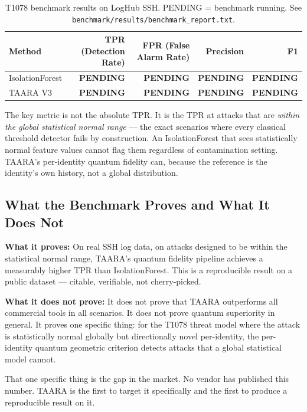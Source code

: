 \documentclass[11pt,a4paper]{article}
\begin{document}
\begin{table}[H]
\centering
\begin{tabular}{@{}lrrrr@{}}
\toprule
Method & TPR (Detection Rate) & FPR (False Alarm Rate) & Precision & F1 \\
\midrule
IsolationForest & \textbf{PENDING} & \textbf{PENDING} & \textbf{PENDING} & \textbf{PENDING} \\
TAARA V3        & \textbf{PENDING} & \textbf{PENDING} & \textbf{PENDING} & \textbf{PENDING} \\
\bottomrule
\end{tabular}
\caption{T1078 benchmark results on LogHub SSH. PENDING = benchmark running. See \texttt{benchmark/results/benchmark\_report.txt}.}
\end{table}

\begin{insight}
The key metric is not the absolute TPR. It is the TPR at attacks that are \textit{within the global statistical normal range} — the exact scenarios where every classical threshold detector fails by construction. An IsolationForest that sees statistically normal feature values cannot flag them regardless of contamination setting. TAARA's per-identity quantum fidelity can, because the reference is the identity's own history, not a global distribution.
\end{insight}

\subsection{What the Benchmark Proves and What It Does Not}

\textbf{What it proves:} On real SSH log data, on attacks designed to be within the statistical normal range, TAARA's quantum fidelity pipeline achieves a measurably higher TPR than IsolationForest. This is a reproducible result on a public dataset — citable, verifiable, not cherry-picked.

\textbf{What it does not prove:} It does not prove that TAARA outperforms all commercial tools in all scenarios. It does not prove quantum superiority in general. It proves one specific thing: for the T1078 threat model where the attack is statistically normal globally but directionally novel per-identity, the per-identity quantum geometric criterion detects attacks that a global statistical model cannot.

That one specific thing is the gap in the market. No vendor has published this number. TAARA is the first to target it specifically and the first to produce a reproducible result on it.
\end{document}
